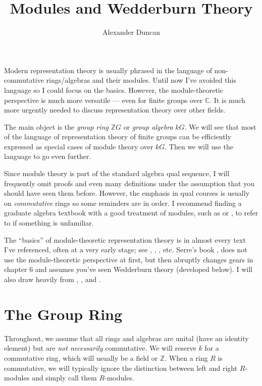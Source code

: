 \documentclass[12pt]{article}
\theoremstyle{plain}
\theoremstyle{definition}
\theoremstyle{remark}
\numberwithin{equation}{section}
\begin{document}
\title{Modules and Wedderburn Theory}
\author{Alexander Duncan}

\maketitle

Modern representation theory is usually phrased in the language of
non-commutative rings/algebras and their modules.
Until now I've avoided this language so I could focus on the basics.
However, the module-theoretic perspective is much more versatile --- even
for finite groups over $\mathbb{C}$.
It is much more urgently needed to discuss representation
theory over other fields. 

The main object is the \emph{group ring} $\mathbb{Z}G$
or \emph{group algebra} $kG$.  We will see that most of the language of
representation theory of finite groups can be efficiently expressed
as special cases of module theory over $kG$.
Then we will use the language to go even further.

Since module theory is part of the standard algebra qual sequence,
I will frequently omit proofs and even many definitions under the
assumption that you should have seen them before.
However, the emphasis in qual courses is usually on
\emph{commutative} rings so some reminders are in order.
I recommend finding a graduate algebra textbook with a good treatment of
modules, such as \cite[\S{10}]{DF} or \cite[\S{III}]{Lang},
to refer to if something is unfamiliar.

The ``basics'' of module-theoretic representation theory is in
almost every text I've referenced, often at a very early stage; 
see \cite{DF}, \cite{Etingof}, \cite{FultonHarris}, \cite{Lang} etc.
Serre's book \cite{Serre}, does not use the module-theoretic
perspective at first, but then abruptly changes gears in chapter 6 and
assumes you've seen Wedderburn theory (developed below).
I will also draw heavily from \cite[\S{12,13}]{AlperinBell},
\cite{AlperinLRT}, and \cite{CurtisReiner}.


\section{The Group Ring}

Throughout, we assume that all rings and algebras are unital (have an identity
element) but are \emph{not necessarily} commutative.
We will reserve $k$ for a commutative ring, which will usually be a
field or $\mathbb{Z}$.
When a ring $R$ is commutative, we will typically ignore the
distinction between left and right $R$-modules and
simply call them $R$-modules.
\end{document}

